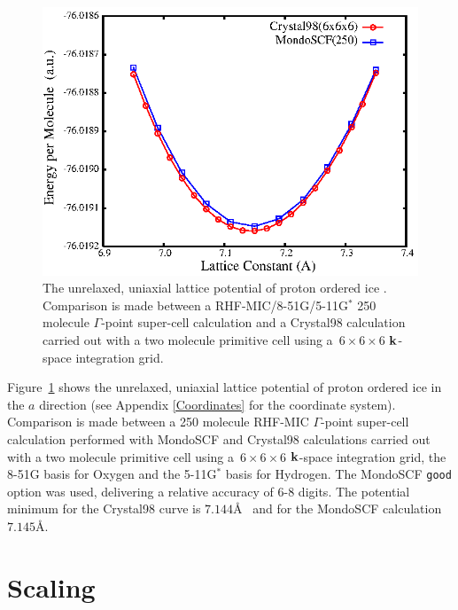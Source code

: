 \documentclass[prb,aps,nobibnotes,twocolumn,doublespace,twocolumngrid,superbib]{revtex4}
\begin{document}
\begin{figure}
\caption{The unrelaxed, uniaxial lattice potential of proton ordered ice \cite{}.
Comparison is made between a RHF-MIC/8-51G/5-11G$^*$ 250 molecule $\Gamma$-point super-cell 
calculation and a {\sc Crystal98} calculation carried out with a two molecule primitive
cell using a~$6\times6\times6$ ${\bf k}$-space integration grid.}
\label{IceEnergyVsLattice}
{\center \includegraphics{pIce_En_vs_a.ps}\par}
\end{figure}

Figure~\ref{IceEnergyVsLattice} shows the unrelaxed, uniaxial lattice potential of 
proton ordered ice \cite{} in the $a$ direction (see Appendix \ref{Coordinates} for the coordinate system).  
Comparison is made between a 250 molecule RHF-MIC $\Gamma$-point super-cell calculation performed 
with {\sc MondoSCF} and {\sc Crystal98} calculations carried out with a two molecule primitive
cell using a~$6\times6\times6$ ${\bf k}$-space integration grid, the 8-51G basis for Oxygen and the 
5-11G${^*}$ basis for Hydrogen.  The {\sc MondoSCF} {\tt good} option was used, delivering 
a relative accuracy of 6-8 digits. The potential minimum for the {\sc Crystal98} curve is $7.144$\AA~
and  for the {\sc MondoSCF} calculation $7.145$\AA.


\section{Scaling}
\end{document}
